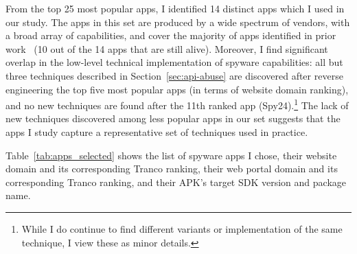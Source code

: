 From the top 25 most popular apps, I identified 14 distinct apps which I used in our study. The apps in this set are produced by a wide spectrum of vendors, with a broad array of capabilities, and cover the majority of apps identified in prior work~\cite{chatterjee2018spyware} (10 out of the 14 apps that are still alive). Moreover, I find significant overlap in the low-level technical implementation of spyware capabilities:  all but three techniques described in Section~\ref{sec:api-abuse} are discovered after reverse engineering the top five most popular apps (in terms of website domain ranking), and no new techniques are found after the 11th ranked app (Spy24).\footnote{While I do continue to find different variants or implementation of the same technique, I view these as minor details.}
The lack of new techniques discovered among less popular apps in our set suggests that the apps I study capture a representative set of techniques used in practice.


Table~\ref{tab:apps_selected} shows the list of spyware apps I chose, their website domain and its corresponding Tranco ranking, their web portal domain and its corresponding Tranco ranking, and their APK's target SDK version and package name.

